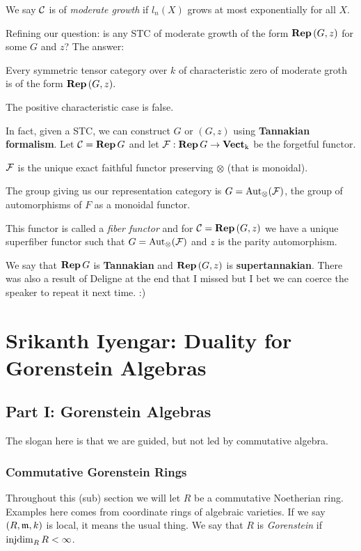 \documentclass[12pt]{article}
\begin{document}
\begin{defn}
We say $\mathcal{C}$ is of \emph{moderate growth} if $l_n(X)$ grows at most exponentially for all $X$.
\end{defn}
Refining our question: is any STC of moderate growth of the form $\mathbf{Rep}\,(G,z)$ for some $G$ and $z$? The answer:
\begin{thm}[Deligne 2002]
Every symmetric tensor category over $k$ of characteristic zero of moderate groth is of the form $\mathbf{Rep}\,(G,z).$
\end{thm}
\begin{rmk}
The positive characteristic case is false.
\end{rmk}

In fact, given a STC, we can construct $G$ or $(G,z)$ using \textbf{Tannakian formalism}. Let $\mathcal{C}=\mathbf{Rep}\, G$ and let $\mathcal{F}:\mathbf{Rep}\, G\to \operatorname{\mathbf{Vect}_k}$ be the forgetful functor.
\begin{thm}
$\mathcal{F}$ is the unique exact faithful functor preserving $\otimes$ (that is monoidal).
\end{thm}
\begin{thm}
The group giving us our representation category is $G=\operatorname{Aut}_\otimes(\mathcal{F})$, the group of automorphisms of $F$ as a monoidal functor.
\end{thm}
This functor is called a \emph{fiber functor} and for $\mathcal{C}=\mathbf{Rep}\,(G,z)$ we have a unique superfiber functor such that $G=\operatorname{Aut}_\otimes(\mathcal{F})$ and $z$ is the parity automorphism.

We say that $\mathbf{Rep}\, G$ is \textbf{Tannakian} and $\mathbf{Rep}\,(G,z)$ is \textbf{supertannakian}. There was also a result of Deligne at the end that I missed but I bet we can coerce the speaker to repeat it next time. :)

\section{Srikanth Iyengar: Duality for Gorenstein Algebras}
\subsection{Part I: Gorenstein Algebras}
The slogan here is that we are guided, but not led by commutative algebra.

\subsubsection{Commutative Gorenstein Rings}
Throughout this (sub) section we will let $R$ be a commutative Noetherian ring. Examples here comes from coordinate rings of algebraic varieties. If we say $(R,\mathfrak{m}, k)$ is local, it means the usual thing. We say that $R$ is \emph{Gorenstein} if $\operatorname{injdim}_R R<\infty$.
\end{document}
